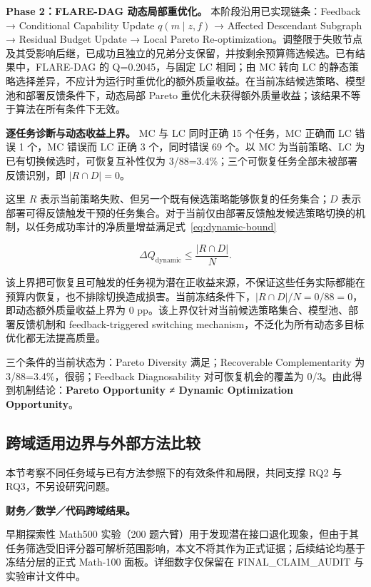 \textbf{Phase 2：FLARE-DAG 动态局部重优化。} 本阶段沿用已实现链条：Feedback → Conditional Capability Update \(q(m\mid z,f)\) → Affected Descendant Subgraph → Residual Budget Update → Local Pareto Re-optimization。调整限于失败节点及其受影响后继，已成功且独立的兄弟分支保留，并按剩余预算筛选候选。已有结果中，FLARE-DAG 的 Q=0.2045，与固定 LC 相同；由 MC 转向 LC 的静态策略选择差异，不应计为运行时重优化的额外质量收益。在当前冻结候选策略、模型池和部署反馈条件下，动态局部 Pareto 重优化未获得额外质量收益；该结果不等于算法在所有条件下无效。

\textbf{逐任务诊断与动态收益上界。} MC 与 LC 同时正确 15 个任务，MC 正确而 LC 错误 1 个，MC 错误而 LC 正确 3 个，同时错误 69 个。以 MC 为当前策略、LC 为已有切换候选时，可恢复互补性仅为 3/88=3.4\%；三个可恢复任务全部未被部署反馈识别，即 \(|R\cap D|=0\)。

这里 \(R\) 表示当前策略失败、但另一个既有候选策略能够恢复的任务集合；\(D\) 表示部署可得反馈触发干预的任务集合。对于当前仅由部署反馈触发候选策略切换的机制，以任务成功率计的净质量增益满足式~\eqref{eq:dynamic-bound}

\begin{equation}\label{eq:dynamic-bound}
\Delta Q_{\mathrm{dynamic}} \le \frac{|R \cap D|}{N}.
\end{equation}

该上界把可恢复且可触发的任务视为潜在正收益来源，不保证这些任务实际都能在预算内恢复，也不排除切换造成损害。当前冻结条件下，\(|R\cap D|/N=0/88=0\)，即动态额外质量收益上界为 0 pp。该上界仅针对当前候选策略集合、模型池、部署反馈机制和 feedback-triggered switching mechanism，不泛化为所有动态多目标优化都无法提高质量。

三个条件的当前状态为：Pareto Diversity 满足；Recoverable Complementarity 为 3/88=3.4\%，很弱；Feedback Diagnosability 对可恢复机会的覆盖为 0/3。由此得到机制结论：\textbf{Pareto Opportunity ≠ Dynamic Optimization Opportunity}。

\FloatBarrier
\subsection{跨域适用边界与外部方法比较}\label{sec:4-5}

本节考察不同任务域与已有方法参照下的有效条件和局限，共同支撑 RQ2 与 RQ3，不另设研究问题。

\textbf{财务／数学／代码跨域结果。}

早期探索性 Math500 实验（200 题六臂）用于发现潜在接口退化现象，但由于其任务筛选受旧评分器可解析范围影响，本文不将其作为正式证据；后续结论均基于冻结分层的正式 Math-100 面板。详细数字仅保留在 FINAL\_CLAIM\_AUDIT 与实验审计文件中。

